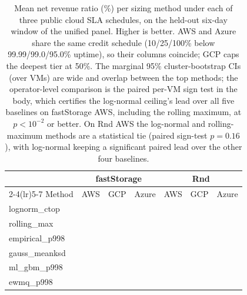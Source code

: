 \documentclass[11pt,a4paper]{article}
\begin{document}
\begin{table}[t]
  \centering
  \small
  \begin{tabular}{lrrrrrr}
    \toprule
    & \multicolumn{3}{c}{fastStorage} & \multicolumn{3}{c}{Rnd} \\
    \cmidrule(lr){2-4}\cmidrule(lr){5-7}
    Method              & AWS        & GCP         & Azure       & AWS        & GCP         & Azure \\
    \midrule
    lognorm\_ctop       & \SlaFsLNAWSNet{} & \SlaFsLNGCPNet{} & \SlaFsLNAzureNet{} & \SlaRnLNAWSNet{} & \SlaRnLNGCPNet{} & \SlaRnLNAzureNet{} \\
    rolling\_max        & \SlaFsRMAWSNet{} & \SlaFsRMGCPNet{} & \SlaFsRMAzureNet{} & \SlaRnRMAWSNet{} & \SlaRnRMGCPNet{} & \SlaRnRMAzureNet{} \\
    empirical\_p998     & \SlaFsEPAWSNet{} & \SlaFsEPGCPNet{} & \SlaFsEPAzureNet{} & \SlaRnEPAWSNet{} & \SlaRnEPGCPNet{} & \SlaRnEPAzureNet{} \\
    gauss\_meanksd      & \SlaFsGAAWSNet{} & \SlaFsGAGCPNet{} & \SlaFsGAAzureNet{} & \SlaRnGAAWSNet{} & \SlaRnGAGCPNet{} & \SlaRnGAAzureNet{} \\
    ml\_gbm\_p998       & \SlaFsMLGBAWSNet{} & \SlaFsMLGBGCPNet{} & \SlaFsMLGBAzureNet{} & \SlaRnMLGBAWSNet{} & \SlaRnMLGBGCPNet{} & \SlaRnMLGBAzureNet{} \\
    ewmq\_p998          & \SlaFsEWMQAWSNet{} & \SlaFsEWMQGCPNet{} & \SlaFsEWMQAzureNet{} & \SlaRnEWMQAWSNet{} & \SlaRnEWMQGCPNet{} & \SlaRnEWMQAzureNet{} \\
    \bottomrule
  \end{tabular}
  \caption{Mean net revenue ratio (\%) per sizing method under each of
    three public cloud SLA schedules, on the held-out six-day window of
    the unified panel. Higher is better. AWS and Azure share the same
    credit schedule (10/25/100\% below 99.99/99.0/95.0\% uptime), so
    their columns coincide; GCP caps the deepest tier at 50\%. The
    marginal 95\% cluster-bootstrap CIs (over VMs) are wide and overlap
    between the top methods; the operator-level comparison is the paired
    per-VM sign test in the body, which certifies the log-normal
    ceiling's lead over all five baselines on fastStorage AWS, including
    the rolling maximum, at $p < 10^{-2}$ or better. On Rnd AWS the
    log-normal and rolling-maximum methods are a statistical tie (paired
    sign-test $p = 0.16$), with log-normal keeping a significant paired
    lead over the other four baselines.}
  \label{tab:sla}
\end{table}
\end{document}

